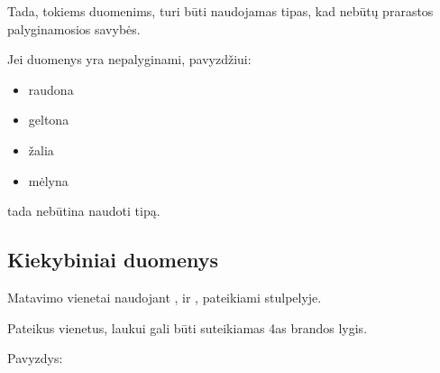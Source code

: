 \documentclass[letterpaper,10pt,lithuanian]{sphinxmanual}
\begin{document}
\sphinxAtStartPar
Tada, tokiems duomenims, turi būti naudojamas  tipas, kad nebūtų
prarastos palyginamosios savybės.

\sphinxAtStartPar
Jei duomenys yra nepalyginami, pavyzdžiui:
\begin{itemize}
\item {} 
\sphinxAtStartPar
raudona

\item {} 
\sphinxAtStartPar
geltona

\item {} 
\sphinxAtStartPar
žalia

\item {} 
\sphinxAtStartPar
mėlyna

\end{itemize}

\sphinxAtStartPar
tada nebūtina naudoti  tipą.


\subsection{Kiekybiniai duomenys}
\label{\detokenize{vienetai:kiekybiniai-duomenys}}
\sphinxAtStartPar
Matavimo vienetai naudojant ,  ir
,  pateikiami {\hyperref[\detokenize{dimensijos:property.ref}]{}}
stulpelyje.

\sphinxAtStartPar
Pateikus vienetus, laukui gali būti suteikiamas 4\sphinxhyphen{}as brandos lygis.

\sphinxAtStartPar
Pavyzdys:
\end{document}

